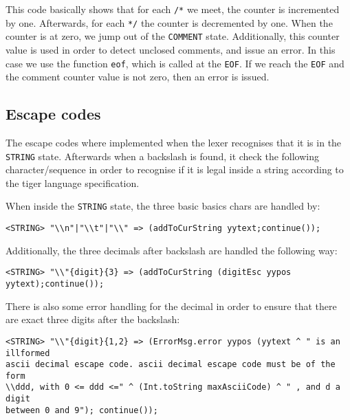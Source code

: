 \documentclass{article}
\begin{document}
This code basically shows that for each \texttt{/*} we meet, the counter is incremented by one. Afterwards, for each \texttt{*/} the counter is decremented by one. When the counter is at zero, we jump out of the \texttt{COMMENT} state. Additionally, this counter value is used in order to detect unclosed comments, and issue an error. In this case we use the function \texttt{eof}, which is called at the \texttt{EOF}. If we reach the \texttt{EOF} and the comment counter value is not zero, then an error is issued.  

\subsection{Escape codes}
The escape codes where implemented when the lexer recognises that it is in the \texttt{STRING} state. Afterwards when a backslash is found, it check the following character/sequence in order to recognise if it is legal inside a string according to the tiger language specification. 


When inside the \texttt{STRING} state, the three basic basics chars are handled by:

\begin{lstlisting}[frame=single]
<STRING> "\\n"|"\\t"|"\\" => (addToCurString yytext;continue());
\end{lstlisting}

Additionally, the three decimals after backslash are handled the following way:

\begin{lstlisting}[frame=single]
<STRING> "\\"{digit}{3} => (addToCurString (digitEsc yypos yytext);continue());
\end{lstlisting}

There is also some error handling for the decimal in order to ensure that there are exact three digits after the backslash:
\begin{lstlisting}[frame=single]
<STRING> "\\"{digit}{1,2} => (ErrorMsg.error yypos (yytext ^ " is an illformed 
ascii decimal escape code. ascii decimal escape code must be of the form 
\\ddd, with 0 <= ddd <=" ^ (Int.toString maxAsciiCode) ^ " , and d a digit 
between 0 and 9"); continue());
\end{lstlisting}
\end{document}
